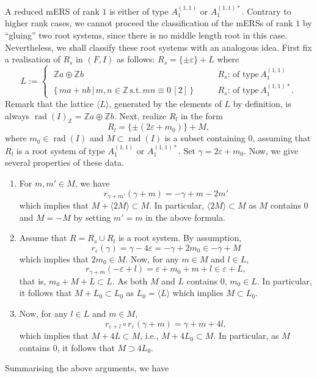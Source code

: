 \documentclass[11pt]{amsart}
\newcommand{\Z}{\mathbb{Z}}
\newcommand{\rad}{\operatorname{rad}}
\newcommand{\vep}{\varepsilon}
\begin{document}
A reduced mERS of rank $1$ is either of type $A_1^{(1,1)}$ or $A_1^{(1,1)\ast}$.  Contrary to higher rank cases, we cannot proceed the classification
of the mERSs of rank $1$ by ``gluing'' two root systems, since there is no middle length root in this case. Nevertheless, we shall classify these root systems with an analogous idea. First fix a realisation of $R_s$ in $(F,I)$ as follows:
$R_s=\{ \pm \vep\}+L$ where
\[ L:=\begin{cases} \; \Z a\oplus \Z b \qquad & R_s:\,\text{of type}\, A_{1}^{(1,1)} \\
          \; \{\, ma+nb\, \vert\, m,n \in \Z\, \text{s.t.}\, mn\equiv 0\, [2]\, \} \qquad 
          & R_s:\, \text{of type}\, A_1^{(1,1)\ast}. \end{cases}
\]
Remark that the lattice $\langle L\rangle$, generated by the elements of $L$ by definition, is always $\rad(I)_{\Z}=\Z a\oplus \Z b$. Next, realize $R_l$ in the form
\[ R_l=\{ \pm (2\vep+m_0)\}+M, \]
where $m_0 \in \rad(I)$ and $M \subset \rad(I)$ is a subset containing $0$, assuming that $R_l$ is a root system of type $A_1^{(1,1)}$ or $A_1^{(1,1)\ast}$. Set $\gamma=2\vep+m_0$. Now, we give several properties of these data. 
\begin{enumerate}
\item For $m, m' \in M$, we have
\[ r_{\gamma+m'}(\gamma+m)=-\gamma+m-2m' \]
which implies that $M+\langle 2M\rangle \subset M$. In particular, 
$\langle 2M \rangle \subset M$ as $M$ contains $0$ and $M=-M$ by setting $m'=m$ in the above formula. 
\item Assume that $R=R_s \cup R_l$ is a root system. By assumption, 
\[ r_\vep(\gamma)=\gamma-4\vep=-\gamma+2m_0 \in -\gamma+M \]
which implies that $2m_0 \in M$.  Now, for any $m \in M$ and $l \in L$, 
\[ r_{\gamma+m}(-\vep+l)=\vep+m_0+m+l \in \vep+L, \]
that is, $m_0+M+L \subset L$. As both $M$ and $L$ contains $0$,  $m_0 \in L$. In particular, it follows that $M+L_0 \subset L_0$ as $L_0=\langle L \rangle$ which implies  $M \subset L_0$. 
\item Now, for any $l \in L$ and $m \in M$, 
\[ r_{\vep+l}\circ r_\vep (\gamma+m)=\gamma+m+4l, \]
which implies that $M+4L \subset M$, i.e., $M+4L_0 \subset M$. In particular, as $M$ contains $0$, it follows that $M \supset 4L_0$.
\end{enumerate}
{Summarising} the above arguments, we have
\end{document}
